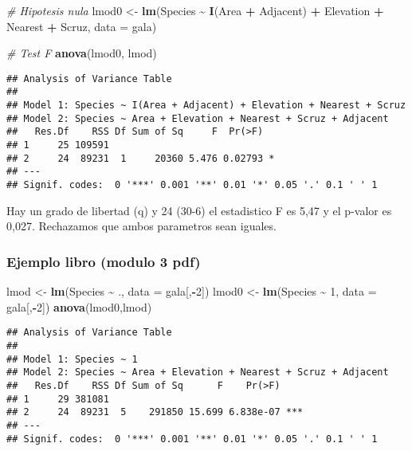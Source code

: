 \documentclass[
]{article}
\newenvironment{Shaded}{\begin{snugshade}}{\end{snugshade}}
\newcommand{\AttributeTok}[1]{\textcolor[rgb]{0.13,0.29,0.53}{#1}}
\newcommand{\CommentTok}[1]{\textcolor[rgb]{0.56,0.35,0.01}{\textit{#1}}}
\newcommand{\DecValTok}[1]{\textcolor[rgb]{0.00,0.00,0.81}{#1}}
\newcommand{\FunctionTok}[1]{\textcolor[rgb]{0.13,0.29,0.53}{\textbf{#1}}}
\newcommand{\NormalTok}[1]{#1}
\newcommand{\OtherTok}[1]{\textcolor[rgb]{0.56,0.35,0.01}{#1}}
\newcommand{\SpecialCharTok}[1]{\textcolor[rgb]{0.81,0.36,0.00}{\textbf{#1}}}
\begin{document}
\begin{Shaded}
\begin{Highlighting}[]
\CommentTok{\# Hipotesis nula}
\NormalTok{lmod0 }\OtherTok{\textless{}{-}} \FunctionTok{lm}\NormalTok{(Species }\SpecialCharTok{\textasciitilde{}} \FunctionTok{I}\NormalTok{(Area }\SpecialCharTok{+}\NormalTok{ Adjacent) }\SpecialCharTok{+}\NormalTok{ Elevation }\SpecialCharTok{+}\NormalTok{ Nearest }\SpecialCharTok{+}\NormalTok{ Scruz, }\AttributeTok{data =}\NormalTok{ gala)}

\CommentTok{\# Test F}
\FunctionTok{anova}\NormalTok{(lmod0, lmod)}
\end{Highlighting}
\end{Shaded}

\begin{verbatim}
## Analysis of Variance Table
## 
## Model 1: Species ~ I(Area + Adjacent) + Elevation + Nearest + Scruz
## Model 2: Species ~ Area + Elevation + Nearest + Scruz + Adjacent
##   Res.Df    RSS Df Sum of Sq     F  Pr(>F)  
## 1     25 109591                             
## 2     24  89231  1     20360 5.476 0.02793 *
## ---
## Signif. codes:  0 '***' 0.001 '**' 0.01 '*' 0.05 '.' 0.1 ' ' 1
\end{verbatim}

Hay un grado de libertad (q) y 24 (30-6) el estadistico F es 5,47 y el
p-valor es 0,027. Rechazamos que ambos parametros sean iguales.

\hypertarget{ejemplo-libro-modulo-3-pdf}{%
\subsubsection{Ejemplo libro (modulo 3
pdf)}\label{ejemplo-libro-modulo-3-pdf}}

\begin{Shaded}
\begin{Highlighting}[]
\NormalTok{lmod }\OtherTok{\textless{}{-}} \FunctionTok{lm}\NormalTok{(Species }\SpecialCharTok{\textasciitilde{}}\NormalTok{ ., }\AttributeTok{data =}\NormalTok{ gala[,}\SpecialCharTok{{-}}\DecValTok{2}\NormalTok{])}
\NormalTok{lmod0 }\OtherTok{\textless{}{-}} \FunctionTok{lm}\NormalTok{(Species }\SpecialCharTok{\textasciitilde{}} \DecValTok{1}\NormalTok{, }\AttributeTok{data =}\NormalTok{ gala[,}\SpecialCharTok{{-}}\DecValTok{2}\NormalTok{])}
\FunctionTok{anova}\NormalTok{(lmod0,lmod)}
\end{Highlighting}
\end{Shaded}

\begin{verbatim}
## Analysis of Variance Table
## 
## Model 1: Species ~ 1
## Model 2: Species ~ Area + Elevation + Nearest + Scruz + Adjacent
##   Res.Df    RSS Df Sum of Sq      F    Pr(>F)    
## 1     29 381081                                  
## 2     24  89231  5    291850 15.699 6.838e-07 ***
## ---
## Signif. codes:  0 '***' 0.001 '**' 0.01 '*' 0.05 '.' 0.1 ' ' 1
\end{verbatim}
\end{document}
